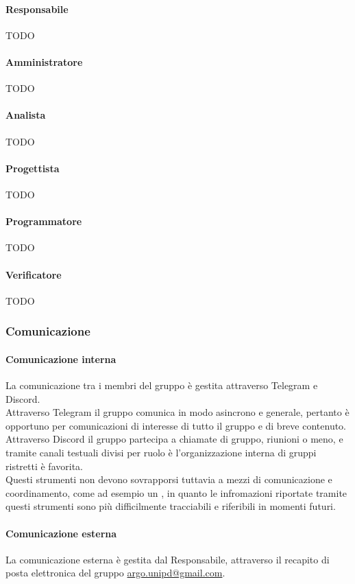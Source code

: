 \paragraph{Responsabile}
TODO
\paragraph{Amministratore}
TODO
\paragraph{Analista}
TODO
\paragraph{Progettista}
TODO
\paragraph{Programmatore}
TODO
\paragraph{Verificatore}
TODO

\subsubsection{Comunicazione}
\paragraph{Comunicazione interna}
La comunicazione tra i membri del gruppo è gestita attraverso Telegram e Discord.\\
Attraverso Telegram il gruppo comunica in modo asincrono e generale, pertanto è opportuno per comunicazioni di interesse di tutto il gruppo e di breve contenuto.\\
Attraverso Discord il gruppo partecipa a chiamate di gruppo, riunioni o meno, e tramite canali testuali divisi per ruolo è l'organizzazione interna di gruppi ristretti è favorita.\\
Questi strumenti non devono sovrapporsi tuttavia a mezzi di comunicazione e coordinamento, come ad esempio un , in quanto le infromazioni riportate tramite questi strumenti sono più difficilmente tracciabili e riferibili in momenti futuri.

\paragraph{Comunicazione esterna}
La comunicazione esterna è gestita dal Responsabile, attraverso il recapito di posta elettronica del gruppo \href{mailto:argo.unipd@gmail.com}{argo.unipd\-@\-gmail.com}.